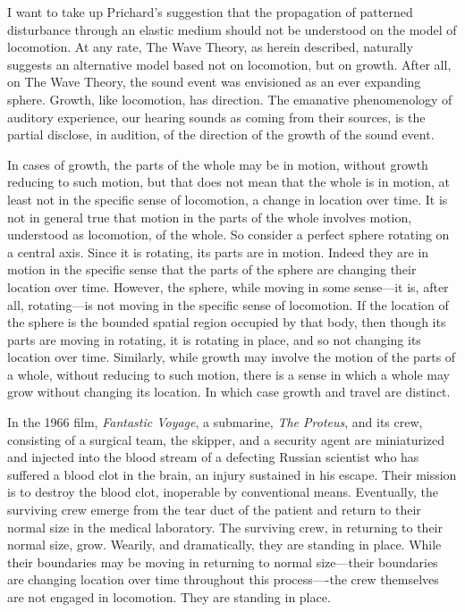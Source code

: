 I want to take up Prichard's suggestion that the propagation of patterned disturbance through an elastic medium should not be understood on the model of locomotion. At any rate, The Wave Theory, as herein described, naturally suggests an alternative model based not on locomotion, but on growth. After all, on The Wave Theory, the sound event was envisioned as an ever expanding sphere. Growth, like locomotion, has direction. The emanative phenomenology of auditory experience, our hearing sounds as coming from their sources, is the partial disclose, in audition, of the direction of the growth of the sound event.

In cases of growth, the parts of the whole may be in motion, without growth reducing to such motion, but that does not mean that the whole is in motion, at least not in the specific sense of locomotion, a change in location over time. It is not in general true that motion in the parts of the whole involves motion, understood as locomotion, of the whole. So consider a perfect sphere rotating on a central axis. Since it is rotating, its parts are in motion. Indeed they are in motion in the specific sense that the parts of the sphere are changing their location over time. However, the sphere, while moving in some sense---it is, after all, rotating---is not moving in the specific sense of locomotion. If the location of the sphere is the bounded spatial region occupied by that body, then though its parts are moving in rotating, it is rotating in place, and so not changing its location over time. Similarly, while growth may involve the motion of the parts of a whole, without reducing to such motion, there is a sense in which a whole may grow without changing its location. In which case growth and travel are distinct.

In the 1966 film, \emph{Fantastic Voyage}, a submarine, \emph{The Proteus}, and its crew, consisting of a surgical team, the skipper, and a security agent are miniaturized and injected into the blood stream of a defecting Russian scientist who has suffered a blood clot in the brain, an injury sustained in his escape. Their mission is to destroy the blood clot, inoperable by conventional means. Eventually, the surviving crew emerge from the tear duct of the patient and return to their normal size in the medical laboratory. The surviving crew, in returning to their normal size, grow. Wearily, and dramatically, they are standing in place. While their boundaries may be moving in returning to normal size---their boundaries are changing location over time throughout this process----the crew themselves are not engaged in locomotion. They are standing in place.

